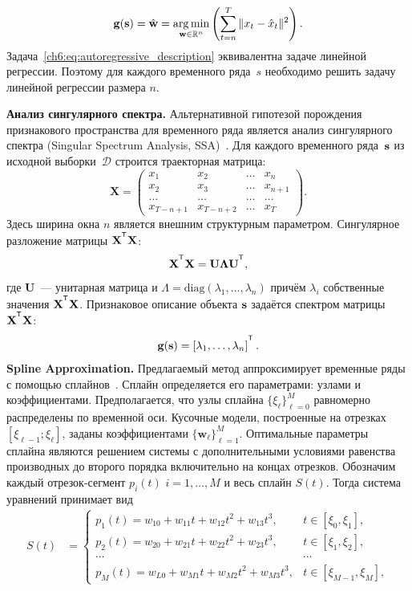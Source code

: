 \documentclass[11pt, a5paper]{dissert}
\begin{document}
\begin{equation}
	\mathbf{g}(\mathbf{s}) = \hat{\mathbf{w}} = \mathop{\arg \min}\limits_{\mathbf{w} \in \mathbb{R}^{n}} \left( \sum_{t=n}^{T} \|x_t - \hat{x}_t\|^2\right).
	\label{ch6:eq:autoregressive_description}
\end{equation}
Задача~\eqref{ch6:eq:autoregressive_description} эквивалентна задаче линейной регрессии.
Поэтому для каждого временного ряда~$s$ необходимо решить задачу линейной регрессии размера $n$.

\textbf{Анализ сингулярного спектра.}
Альтернативной гипотезой порождения признакового пространства для временного ряда является анализ сингулярного спектра (Singular Spectrum Analysis, SSA)~\cite{hassani2007singular}. 
Для каждого временного ряда~$\mathbf{s}$ из исходной выборки~$\mathcal{D}$ строится траекторная матрица:
\[
	\mathbf{X} = 
	\begin{pmatrix}
		x_1 & x_2 & \dots & x_n \\
		x_2 & x_3 & \dots & x_{n+1} \\
		\dots & \dots & \dots & \dots \\
		x_{T-n+1} & x_{T-n+2} & \dots & x_T
	\end{pmatrix}.
\]
Здесь ширина окна $n$ является внешним структурным параметром.
Сингулярное разложение матрицы $\mathbf{X}^{\T} \mathbf{X}$:
\[
	\mathbf{X}^{\T} \mathbf{X} = \mathbf{U} \mathbf{\Lambda} \mathbf{U}^{\T},
\]
где $\mathbf{U}$~--- унитарная матрица и $\Lambda = \mathrm{diag}(\lambda_1, \dots, \lambda_n)$ причём $\lambda_i$ собственные значения $\mathbf{X}^{\T} \mathbf{X}$. 
Признаковое описание объекта $\mathbf{s}$ задаётся спектром матрицы $\mathbf{X}^{\T} \mathbf{X}$:
\[
	\mathbf{g}(\bs) = \left[\lambda_1, \dots, \lambda_n\right]^{\T}.
\]
\textbf{Spline Approximation.}
Предлагаемый метод аппроксимирует временные ряды с помощью сплайнов~\cite{deboor1978splines}. Сплайн определяется его параметрами: узлами и коэффициентами.
Предполагается, что узлы сплайна $\{\xi_\ell\}_{\ell=0}^M$ равномерно распределены по временной оси.
Кусочные модели, построенные на отрезках $[\xi_{\ell-1}; \xi_{\ell}]$, заданы коэффициентами $\{\mathbf{w}_\ell\}_{\ell=1}^{M}$.
Оптимальные параметры сплайна являются решением системы с дополнительными условиями равенства производных до второго порядка включительно на концах отрезков.
Обозначим каждый отрезок-сегмент $p_i(t)$ $i = 1, \dots, M$ и весь сплайн $S(t)$. Тогда система уравнений принимает вид
\begin{align*}
	S(t) &= \begin{cases}
		p_1(t) = w_{10} +w_{11}t + w_{12}t^2 + w_{13}t^3, & t\in [\xi_0, \xi_1],\\
		p_2(t) = w_{20} +w_{21}t + w_{22}t^2 + w_{23}t^3, & t\in [\xi_1, \xi_2],\\
		\cdots&\cdots \\
		p_{M}(t) = w_{L0} +w_{M1}t + w_{M2}t^2 + w_{M3}t^3, & t\in [\xi_{M-1}, \xi_M],					
	\end{cases}
\end{align*}
\end{document}
